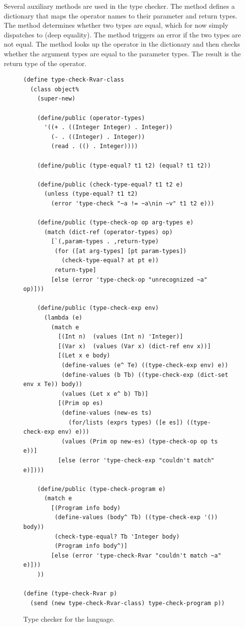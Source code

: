 \documentclass[11pt]{book}
\begin{document}
Several auxiliary methods are used in the type checker. The method
 defines a dictionary that maps the operator
names to their parameter and return types. The 
method determines whether two types are equal, which for now simply
dispatches to   (deep equality). The
 method triggers an error if the two types are
not equal. The  method looks up the operator in
the  dictionary and then checks whether the
argument types are equal to the parameter types.  The result is the
return type of the operator.

\begin{figure}[tbp]
\begin{lstlisting}[basicstyle=\ttfamily\footnotesize]
(define type-check-Rvar-class
  (class object%
    (super-new)

    (define/public (operator-types)
      '((+ . ((Integer Integer) . Integer))
        (- . ((Integer) . Integer))
        (read . (() . Integer))))

    (define/public (type-equal? t1 t2) (equal? t1 t2))

    (define/public (check-type-equal? t1 t2 e)
      (unless (type-equal? t1 t2)
        (error 'type-check "~a != ~a\nin ~v" t1 t2 e)))

    (define/public (type-check-op op arg-types e)
      (match (dict-ref (operator-types) op)
        [`(,param-types . ,return-type)
         (for ([at arg-types] [pt param-types])
           (check-type-equal? at pt e))
         return-type]
        [else (error 'type-check-op "unrecognized ~a" op)]))

    (define/public (type-check-exp env)
      (lambda (e)
        (match e
          [(Int n)  (values (Int n) 'Integer)]
          [(Var x)  (values (Var x) (dict-ref env x))]
          [(Let x e body)
           (define-values (e^ Te) ((type-check-exp env) e))
           (define-values (b Tb) ((type-check-exp (dict-set env x Te)) body))
           (values (Let x e^ b) Tb)]
          [(Prim op es)
           (define-values (new-es ts)
             (for/lists (exprs types) ([e es]) ((type-check-exp env) e)))
           (values (Prim op new-es) (type-check-op op ts e))]
          [else (error 'type-check-exp "couldn't match" e)])))

    (define/public (type-check-program e)
      (match e
        [(Program info body)
         (define-values (body^ Tb) ((type-check-exp '()) body))
         (check-type-equal? Tb 'Integer body)
         (Program info body^)]
        [else (error 'type-check-Rvar "couldn't match ~a" e)]))
    ))

(define (type-check-Rvar p)
  (send (new type-check-Rvar-class) type-check-program p))
\end{lstlisting}
\caption{Type checker for the \LangVar{} language.}
\label{fig:type-check-Rvar}
\end{figure}
\end{document}
